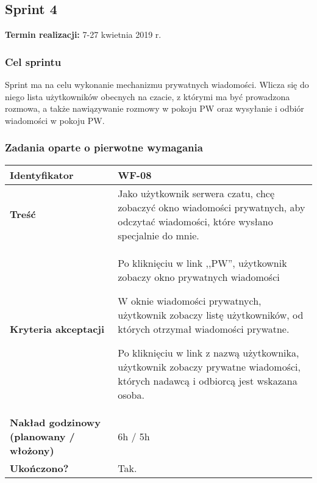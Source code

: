 \subsection{Sprint 4}

\textbf{Termin realizacji:} 7-27 kwietnia 2019 r.

\subsubsection{Cel sprintu}
Sprint ma na celu wykonanie mechanizmu prywatnych wiadomości. Wlicza się do
niego lista użytkowników obecnych na czacie, z którymi ma być prowadzona
rozmowa, a także nawiązywanie rozmowy w pokoju PW oraz wysyłanie i odbiór
wiadomości w pokoju PW.

\subsubsection{Zadania oparte o pierwotne wymagania}

\leavevmode\hbox{}

\begin{tabular}{ | l | l | }
	\hline
		\textbf{Identyfikator} &
		WF-08
		\\

	\hline
		\textbf{Treść} & \parbox[t]{11.5cm}{\strut
			Jako użytkownik serwera czatu, chcę zobaczyć
			okno wiadomości prywatnych, aby odczytać wiadomości,
			które wysłano specjalnie do mnie.
		\strut}\\


	\hline
		\parbox[t]{4cm}{\textbf{Kryteria akceptacji}} & \parbox[t]{11.5cm}{\strut
			\begin{enumreq}
				\item Po kliknięciu w link ,,PW'', użytkownik
				zobaczy okno prywatnych wiadomości
				\item W oknie wiadomości prywatnych, użytkownik
				zobaczy listę użytkowników, od których otrzymał
				wiadomości prywatne.
				\item Po kliknięciu w link z nazwą użytkownika,
				użytkownik zobaczy prywatne wiadomości, których
				nadawcą i odbiorcą jest wskazana osoba.
			\end{enumreq}
			\strut}
		\\
    \hline
      \parbox[t]{4cm}{\textbf{Nakład godzinowy (planowany / włożony)}} &
      \parbox[t]{11.5cm}{\strut
        6h / 5h
      \strut}\\

      \hline
        \parbox[t]{4cm}{\textbf{Ukończono?}} &
        \parbox[t]{11.5cm}{\strut
          Tak.
        \strut}\\
	\hline
\end{tabular}

